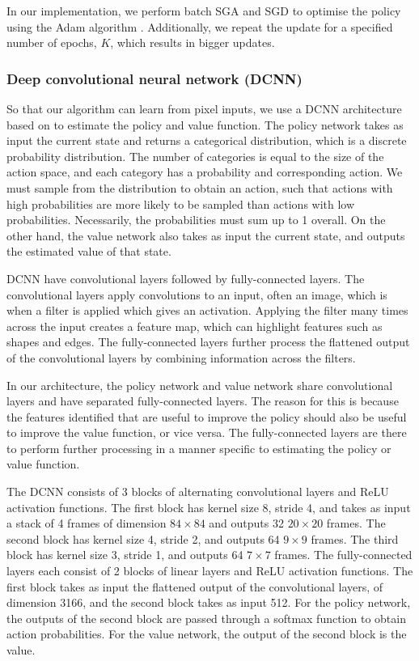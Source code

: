 \documentclass[12pt,a4paper]{article}
\begin{document}
In our implementation, we perform batch SGA and SGD to optimise the policy using the Adam algorithm \cite{kingma2017adam}. Additionally, we repeat the update for a specified number of epochs, $K$, which results in bigger updates.

\subsubsection{Deep convolutional neural network (DCNN)}
So that our algorithm can learn from pixel inputs, we use a DCNN architecture based on \cite{Mnih2015} to estimate the policy and value function. The policy network takes as input the current state and returns a categorical distribution, which is a discrete probability distribution. The number of categories is equal to the size of the action space, and each category has a probability and corresponding action. We must sample from the distribution to obtain an action, such that actions with high probabilities are more likely to be sampled than actions with low probabilities. Necessarily, the probabilities must sum up to 1 overall. On the other hand, the value network also takes as input the current state, and outputs the estimated value of that state. 

DCNN have convolutional layers followed by fully-connected layers. The convolutional layers apply convolutions to an input, often an image, which is when a filter is applied which gives an activation. Applying the filter many times across the input creates a feature map, which can highlight features such as shapes and edges. The fully-connected layers further process the flattened output of the convolutional layers by combining information across the filters.

In our architecture, the policy network and value network share convolutional layers and have separated fully-connected layers. The reason for this is because the features identified that are useful to improve the policy should also be useful to improve the value function, or vice versa. The fully-connected layers are there to perform further processing in a manner specific to estimating the policy or value function. 

The DCNN consists of 3 blocks of alternating convolutional layers and ReLU activation functions. The first block has kernel size 8, stride 4, and takes as input a stack of 4 frames of dimension $84 \times 84$ and outputs 32 $20 \times 20$ frames. The second block has kernel size 4, stride 2, and outputs 64 $9 \times 9$ frames. The third block has kernel size 3, stride 1, and outputs 64 $7 \times 7$ frames. The fully-connected layers each consist of 2 blocks of linear layers and ReLU activation functions. The first block takes as input the flattened output of the convolutional layers, of dimension 3166, and the second block takes as input 512. For the policy network, the outputs of the second block are passed through a softmax function to obtain action probabilities. For the value network, the output of the second block is the value.
\end{document}
